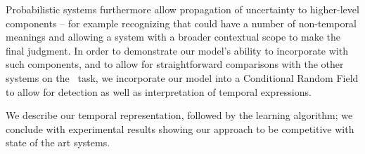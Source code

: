 Probabilistic systems furthermore allow propagation of uncertainty
	to higher-level components -- for example recognizing that  could
	have a number of non-temporal meanings and allowing a system with a broader
	contextual scope to make the final judgment.
In order to demonstrate our model's ability to incorporate with such components,
	and to allow for straightforward comparisons with the other systems on the
	\tempeval\ task, we incorporate our model into a Conditional Random Field
	\cite{key:2001lafferty-crf} to allow for detection as well as interpretation
	of temporal expressions.

We describe our temporal representation,
	followed by the learning algorithm; 
	we conclude with experimental results showing our
	approach to be competitive with state of the art systems.


